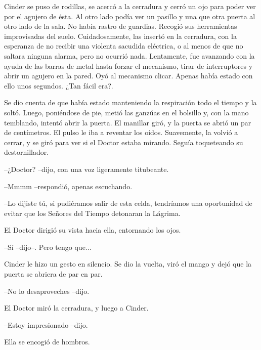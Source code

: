 Cinder se puso de rodillas, se acercó a la cerradura y cerró un ojo para poder ver por el agujero de ésta. Al otro lado podía ver un pasillo y una que otra puerta al otro lado de la sala. No había rastro de guardias. Recogió sus herramientas improvisadas del suelo. Cuidadosamente, las insertó en la cerradura, con la esperanza de no recibir una violenta sacudida eléctrica, o al menos de que no saltara ninguna alarma, pero no ocurrió nada. Lentamente, fue avanzando con la ayuda de las barras de metal hasta forzar el mecanismo, tirar de interruptores y abrir un agujero en la pared. Oyó al mecanismo clicar. Apenas había estado con ello unos segundos. ¿Tan fácil era?.

Se dio cuenta de que había estado manteniendo la respiración todo el tiempo y la soltó. Luego, poniéndose de pie, metió las ganzúas en el bolsillo y, con la mano temblando, intentó abrir la puerta. El manillar giró, y la puerta se abrió un par de centímetros. El pulso le iba a reventar los oídos. Suavemente, la volvió a cerrar, y se giró para ver si el Doctor estaba mirando. Seguía toqueteando su destornillador.



--¿Doctor? --dijo, con una voz ligeramente titubeante.



--Mmmm --respondió, apenas escuchando. 



--Lo dijiste tú, si pudiéramos salir de esta celda, tendríamos una oportunidad de evitar que los Señores del Tiempo detonaran la Lágrima.



El Doctor dirigió su vista hacia ella, entornando los ojos.



--Sí --dijo--. Pero tengo que...



Cinder le hizo un gesto en silencio. Se dio la vuelta, viró el mango y dejó que la puerta se abriera de par en par.



--No lo desaproveches --dijo.



El Doctor miró la cerradura, y luego a Cinder.



--Estoy impresionado --dijo.



Ella se encogió de hombros.




